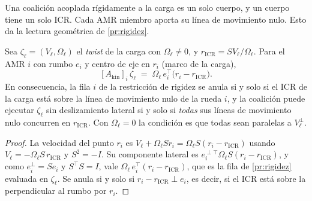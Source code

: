 Una coalición acoplada rígidamente a la carga es un solo cuerpo, y un cuerpo
tiene un solo ICR. Cada AMR miembro aporta su línea de movimiento nulo. Esto da
la lectura geométrica de \cref{pr:rigidez}.

\begin{teorema}
\label{th:icr-comun}
Sea $\zeta_\ell=(V_\ell,\Omega_\ell)$ el \emph{twist} de la carga con
$\Omega_\ell\neq0$, y $r_{\mathrm{ICR}}=SV_\ell/\Omega_\ell$. Para el AMR $i$ con
rumbo $e_i$ y centro de eje en $r_i$ (marco de la carga),
\[
  [A_{\mathrm{kin}}]_i\,\zeta_\ell\;=\;\Omega_\ell\,e_i^{\!\top}\bigl(r_i-r_{\mathrm{ICR}}\bigr).
\]
En consecuencia, la fila $i$ de la restricción de rigidez se anula si y solo si
el ICR de la carga está sobre la línea de movimiento nulo de la rueda $i$, y la
coalición puede ejecutar $\zeta_\ell$ sin deslizamiento lateral si y solo si
\emph{todas} sus líneas de movimiento nulo concurren en $r_{\mathrm{ICR}}$. Con
$\Omega_\ell=0$ la condición es que todas sean paralelas a $V_\ell^{\perp}$.
\end{teorema}

\begin{proof}
La velocidad del punto $r_i$ es $V_\ell+\Omega_\ell Sr_i=\Omega_\ell S(r_i-r_{\mathrm{ICR}})$
usando $V_\ell=-\Omega_\ell S\,r_{\mathrm{ICR}}$ y $S^{2}=-I$. Su componente
lateral es $e_i^{\perp\top}\Omega_\ell S(r_i-r_{\mathrm{ICR}})$, y como
$e_i^{\perp}=Se_i$ y $S^{\!\top}S=I$, vale $\Omega_\ell\,e_i^{\!\top}(r_i-r_{\mathrm{ICR}})$,
que es la fila de \cref{pr:rigidez} evaluada en $\zeta_\ell$. Se anula si y solo
si $r_i-r_{\mathrm{ICR}}\perp e_i$, es decir, si el ICR está sobre la
perpendicular al rumbo por $r_i$.
\end{proof}

